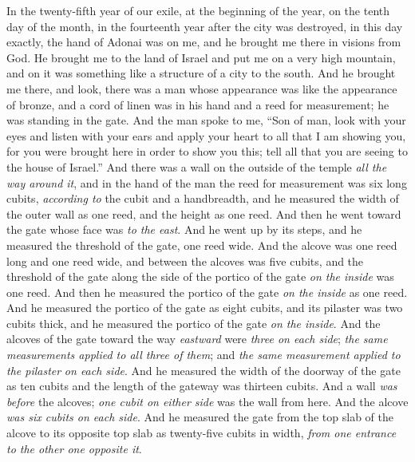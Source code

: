 \begin{biblechapter} %
 In the twenty-fifth year of our exile, at the beginning of the year, on the tenth day of the month, in the fourteenth year after the city was destroyed, in this day exactly, the hand of Adonai was on me, and he brought me there
\verse in visions from God. He brought me to the land of Israel and put me on a very high mountain, and on it was something like a structure of a city to the south.
\verse And he brought me there, and look, there was a man whose appearance was like the appearance of bronze, and a cord of linen was in his hand and a reed for measurement; he was standing in the gate.
\verse And the man spoke to me, “Son of man, look with your eyes and listen with your ears and apply your heart to all that I am showing you, for you were brought here in order to show you this; tell all that you are seeing to the house of Israel.”
 And there was a wall on the outside of the temple \textit{all the way around it}, and in the hand of the man the reed for measurement was six long cubits, \textit{according to} the cubit and a handbreadth, and he measured the width of the outer wall as one reed, and the height as one reed.
\verse And then he went toward the gate whose face was \textit{to the east}. And he went up by its steps, and he measured the threshold of the gate, one reed wide.
\verse And the alcove was one reed long and one reed wide, and between the alcoves was five cubits, and the threshold of the gate along the side of the portico of the gate \textit{on the inside} was one reed.
\verse And then he measured the portico of the gate \textit{on the inside} as one reed.
\verse And he measured the portico of the gate as eight cubits, and its pilaster was two cubits thick, and he measured the portico of the gate \textit{on the inside}.
\verse And the alcoves of the gate toward the way \textit{eastward} were \textit{three on each side}; \textit{the same measurements applied to all three of them}; and \textit{the same measurement applied to the pilaster} \textit{on each side}.
\verse And he measured the width of the doorway of the gate as ten cubits and the length of the gateway was thirteen cubits.
\verse And a wall \textit{was before} the alcoves; \textit{one cubit on either side} was the wall from here. And the alcove \textit{was six cubits on each side}.
\verse And he measured the gate from the top slab of the alcove to its opposite top slab as twenty-five cubits in width, \textit{from one entrance to the other one opposite it}.

\end{biblechapter}
